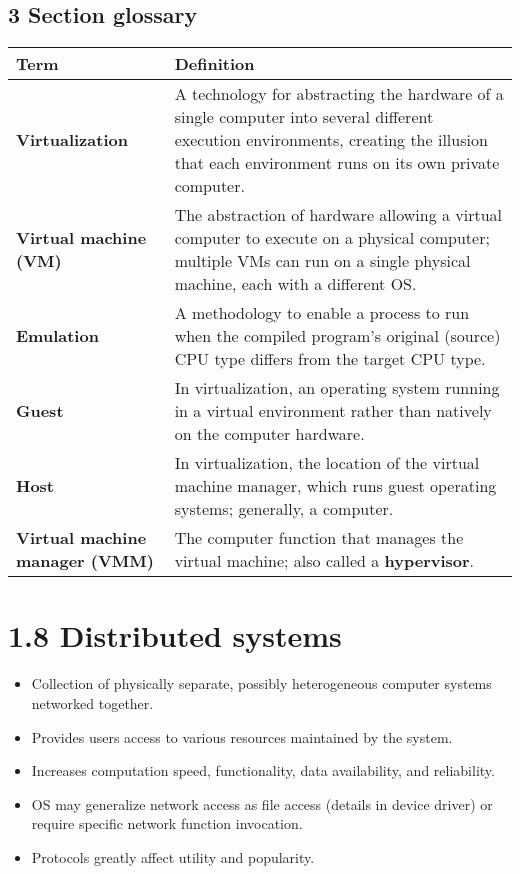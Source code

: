 \documentclass{article}
\begin{document}
\subsection*{3 Section glossary}
\centering
\begin{tabular}{>{\raggedright}p{} >{\raggedright\arraybackslash}p{}}
\toprule
\textbf{Term} & \textbf{Definition} \\
\midrule
\textbf{Virtualization} & A technology for abstracting the hardware of a single computer into several different execution environments, creating the illusion that each environment runs on its own private computer. \\
\textbf{Virtual machine (VM)} & The abstraction of hardware allowing a virtual computer to execute on a physical computer; multiple VMs can run on a single physical machine, each with a different OS. \\
\textbf{Emulation} & A methodology to enable a process to run when the compiled program's original (source) CPU type differs from the target CPU type. \\
\textbf{Guest} & In virtualization, an operating system running in a virtual environment rather than natively on the computer hardware. \\
\textbf{Host} & In virtualization, the location of the virtual machine manager, which runs guest operating systems; generally, a computer. \\
\textbf{Virtual machine manager (VMM)} & The computer function that manages the virtual machine; also called a \textbf{hypervisor}. \\
\bottomrule
\end{tabular}
\vspace{\baselineskip}
\newpage
\section*{1.8 Distributed systems}
\begin{itemize}
    \item Collection of physically separate, possibly heterogeneous computer systems networked together.
    \item Provides users access to various resources maintained by the system.
    \item Increases computation speed, functionality, data availability, and reliability.
    \item OS may generalize network access as file access (details in device driver) or require specific network function invocation.
    \item Protocols greatly affect utility and popularity.
\end{itemize}
\end{document}
